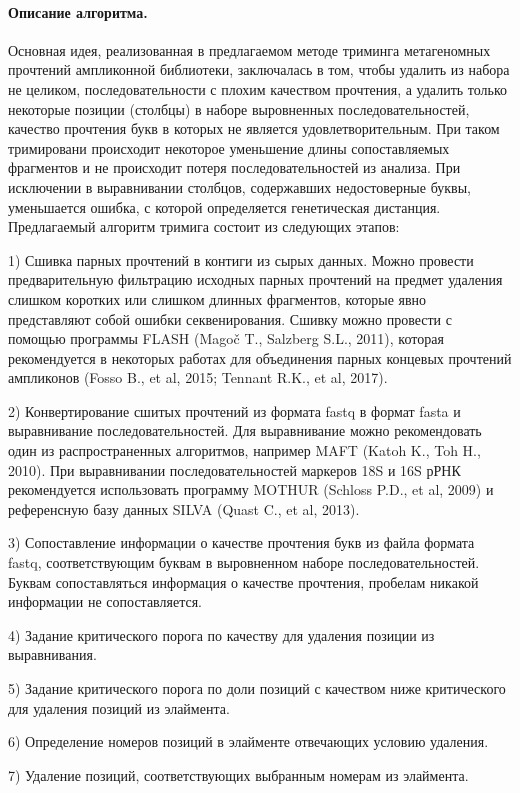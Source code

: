 \documentclass[a4paper,12pt,openany,final]{extreport}
\begin{document}
\paragraph{Описание алгоритма.} Основная идея, реализованная в
предлагаемом методе триминга метагеномных прочтений ампликонной
библиотеки, заключалась в том, чтобы удалить из набора не целиком,
последовательности с плохим качеством прочтения, а удалить только
некоторые позиции (столбцы) в наборе выровненных последовательностей,
качество прочтения букв в которых не является удовлетворительным. При
таком тримировани происходит некоторое уменьшение длины сопоставляемых
фрагментов и не происходит потеря последовательностей из анализа. При
исключении в выравнивании столбцов, содержавших недостоверные буквы,
уменьшается ошибка, с которой определяется генетическая дистанция.
Предлагаемый алгоритм тримига состоит из следующих этапов:

1) Сшивка парных прочтений в контиги из сырых данных. Можно провести
предварительную фильтрацию исходных парных прочтений на предмет удаления
слишком коротких или слишком длинных фрагментов, которые явно
представляют собой ошибки секвенирования. Сшивку можно провести с
помощью программы FLASH (Magoč T., Salzberg S.L., 2011), которая
рекомендуется в некоторых работах для объединения парных концевых
прочтений ампликонов (Fosso B., et al, 2015; Tennant R.K., et al, 2017).

2) Конвертирование сшитых прочтений из формата fastq в формат fasta и
выравнивание последовательностей. Для выравнивание можно рекомендовать
один из распространенных алгоритмов, например MAFT (Katoh K., Toh H.,
2010). При выравнивании последовательностей маркеров 18S и 16S рРНК
рекомендуется использовать программу MOTHUR (Schloss P.D., et al, 2009)
и референсную базу данных SILVA (Quast C., et al, 2013).

3) Сопоставление информации о качестве прочтения букв из файла формата
fastq, соответствующим буквам в выровненном наборе последовательностей.
Буквам сопоставляться информация о качестве прочтения, пробелам никакой
информации не сопоставляется.

4) Задание критического порога по качеству для удаления позиции из
выравнивания.

5) Задание критического порога по доли позиций с качеством ниже
критического для удаления позиций из элаймента.

6) Определение номеров позиций в элайменте отвечающих условию удаления.

7) Удаление позиций, соответствующих выбранным номерам из элаймента.
\end{document}
